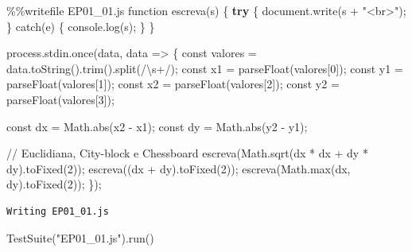 \documentclass[
  portuguese,
  letterpaper,
  openany,
  oneside,
  12pt,
  a4paper]{book}
\newenvironment{Shaded}{\begin{snugshade}}{\end{snugshade}}
\newcommand{\BuiltInTok}[1]{\textcolor[rgb]{0.00,0.23,0.31}{#1}}
\newcommand{\ControlFlowTok}[1]{\textcolor[rgb]{0.00,0.23,0.31}{\textbf{#1}}}
\newcommand{\DecValTok}[1]{\textcolor[rgb]{0.68,0.00,0.00}{#1}}
\newcommand{\NormalTok}[1]{\textcolor[rgb]{0.00,0.23,0.31}{#1}}
\newcommand{\OperatorTok}[1]{\textcolor[rgb]{0.37,0.37,0.37}{#1}}
\newcommand{\StringTok}[1]{\textcolor[rgb]{0.13,0.47,0.30}{#1}}
\begin{document}
\begin{Shaded}
\begin{Highlighting}[]
\OperatorTok{\%\%}\NormalTok{writefile EP01\_01.js}
\NormalTok{function escreva(s) \{ }\ControlFlowTok{try}\NormalTok{ \{ document.write(s }\OperatorTok{+} \StringTok{"\textless{}br\textgreater{}"}\NormalTok{)}\OperatorTok{;}\NormalTok{ \} catch(e) \{ console.log(s)}\OperatorTok{;}\NormalTok{ \} \}}

\NormalTok{process.stdin.once(}\StringTok{\textquotesingle{}data\textquotesingle{}}\NormalTok{, data }\OperatorTok{=\textgreater{}}\NormalTok{ \{}
\NormalTok{  const valores }\OperatorTok{=}\NormalTok{ data.toString().trim().split(}\OperatorTok{/}\NormalTok{\textbackslash{}s}\OperatorTok{+/}\NormalTok{)}\OperatorTok{;}
\NormalTok{  const x1 }\OperatorTok{=}\NormalTok{ parseFloat(valores[}\DecValTok{0}\NormalTok{])}\OperatorTok{;}
\NormalTok{  const y1 }\OperatorTok{=}\NormalTok{ parseFloat(valores[}\DecValTok{1}\NormalTok{])}\OperatorTok{;}
\NormalTok{  const x2 }\OperatorTok{=}\NormalTok{ parseFloat(valores[}\DecValTok{2}\NormalTok{])}\OperatorTok{;}
\NormalTok{  const y2 }\OperatorTok{=}\NormalTok{ parseFloat(valores[}\DecValTok{3}\NormalTok{])}\OperatorTok{;}

\NormalTok{  const dx }\OperatorTok{=}\NormalTok{ Math.}\BuiltInTok{abs}\NormalTok{(x2 }\OperatorTok{{-}}\NormalTok{ x1)}\OperatorTok{;}
\NormalTok{  const dy }\OperatorTok{=}\NormalTok{ Math.}\BuiltInTok{abs}\NormalTok{(y2 }\OperatorTok{{-}}\NormalTok{ y1)}\OperatorTok{;}

  \OperatorTok{//}\NormalTok{ Euclidiana, City}\OperatorTok{{-}}\NormalTok{block e Chessboard}
\NormalTok{  escreva(Math.sqrt(dx }\OperatorTok{*}\NormalTok{ dx }\OperatorTok{+}\NormalTok{ dy }\OperatorTok{*}\NormalTok{ dy).toFixed(}\DecValTok{2}\NormalTok{))}\OperatorTok{;}
\NormalTok{  escreva((dx }\OperatorTok{+}\NormalTok{ dy).toFixed(}\DecValTok{2}\NormalTok{))}\OperatorTok{;}
\NormalTok{  escreva(Math.}\BuiltInTok{max}\NormalTok{(dx, dy).toFixed(}\DecValTok{2}\NormalTok{))}\OperatorTok{;}
\NormalTok{\})}\OperatorTok{;}
\end{Highlighting}
\end{Shaded}

\begin{verbatim}
Writing EP01_01.js
\end{verbatim}

\begin{Shaded}
\begin{Highlighting}[]
\NormalTok{TestSuite(}\StringTok{"EP01\_01.js"}\NormalTok{).run()}
\end{Highlighting}
\end{Shaded}
\end{document}
